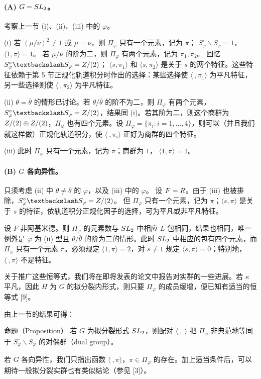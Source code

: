 \paragraph*{(A) $G=SL_2$。}考察上一节 (i)、(ii)、(iii) 中的 $\varphi$。

(i) 若 $(\mu/\nu)^2\ne1$ 或 $\mu=\nu$，则 $\Pi_\varphi$ 只有一个元素，记为 $\pi$；
$S_\varphi^\circ\backslash S_\varphi=1$，$\langle1,\pi\rangle=1$。
若 $\mu/\nu$ 的阶为二，则 $\Pi_\varphi$ 有两个元素，记为 $\pi_1,\pi_2$。
回忆 $S_\varphi^\circ\backslash S_\varphi=\Z/(2)$；
$\langle s,\pi_1\rangle$ 和 $\langle s,\pi_2\rangle$ 是关于 $s$ 的两个特征。这些特征依赖于第 5 节正规化轨道积分时作出的选择：某些选择使
$\langle\ ,\pi_1\rangle$ 为平凡特征，另一些选择则使 $\langle\ ,\pi_2\rangle$ 为平凡特征。

(ii) $\theta=\overline\theta$ 的情形已讨论。若 $\theta/\overline\theta$ 的阶不为二，则
$\Pi_\varphi$ 有两个元素，$S_\varphi^\circ\backslash S_\varphi=\Z/(2)$，结果同 (i)。若其阶为二，则这个商群为
$Z/(2)\oplus Z/(2)$，$\Pi_\varphi$ 也有四个元素。设
$\Pi_\varphi=\{\pi_i:i=1,\ldots,4\}$，则可以（并且我们就这样做）正规化轨道积分，使
$\langle\ ,\pi_i\rangle$ 正好为商群的四个特征。

(iii) 此时 $\Pi_\varphi$ 只有一个元素，记为 $\pi$；商群为 $1$，
$\langle1,\pi\rangle=1$。

\paragraph*{(B) $G$ 各向异性。}
只须考虑 (ii) 中 $\theta\ne\overline\theta$ 的 $\varphi$，以及 (iii) 中的 $\varphi$。
设 $F=R$。由于 (iii) 也被排除，$S_\varphi^\circ\backslash S_\varphi=\Z/(2)$。
但 $\Pi_\varphi$ 只有一个元素，记为 $\pi$；$\langle s,\pi\rangle$ 是关于 $s$ 的特征，依轨道积分正规化因子的选择，可为平凡或非平凡特征。

设 $F$ 非阿基米德。则 $\Pi_\varphi$ 的元素数与 $SL_2$ 中相应 $L$ 包相同，结果也相同，唯一例外是 $\varphi$ 为 (ii) 型且
$\theta/\overline\theta$ 的阶为二的情形。此时 $SL_2$ 中相应的包有四个元素，而
$\Pi_\varphi$ 只有一个元素 $\pi$。必须规定
$\langle1,\pi\rangle=2$，对 $s\ne1$ 规定 $\langle s,\pi\rangle=0$；特别地，
$\langle\ ,\pi\rangle$ 不是特征。

关于推广这些恒等式，我们将在即将发表的论文中报告对实群的一些进展。若 $\kappa$ 平凡，因此 $H$ 为 $G$ 的拟分裂内形式，则只要
$\Pi_\varphi$ 的成员缓增，便已知有适当的恒等式 [9]。

由上一节的结果可得：
\begin{originaltheorem}{命题（Proposition）}
若 $G$ 为拟分裂形式 $SL_2$，则配对 $\langle\ ,\ \rangle$ 把
$\Pi_\varphi$ 非典范地等同于 $S_\varphi^\circ\backslash S_\varphi$ 的对偶群（dual group）。
\end{originaltheorem}
若 $G$ 各向异性，我们只指出函数 $\langle\ ,\pi\rangle$，$\pi\in\Pi_\varphi$ 的存在。加上适当条件后，可以期待一般拟分裂实群也有类似结论（参见 [3]）。

